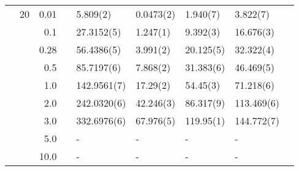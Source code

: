 \begin{table}[H]
\begin{tabularx}{\textwidth}{R{1cm}rrcR{2.3cm}R{2.3cm}R{2.3cm}R{2.3cm}R{1cm}}
		&20 & 0.01 && 5.809(2) & 0.0473(2) & 1.940(7) & 3.822(7) \\
		&& 0.1 && 27.3152(5) & 1.247(1) & 9.392(3) & 16.676(3) \\
		&& 0.28 && 56.4386(5) & 3.991(2) & 20.125(5) & 32.322(4) \\
		&& 0.5 && 85.7197(6) & 7.868(2) & 31.383(6) & 46.469(5) \\
		&& 1.0 && 142.9561(7) & 17.29(2) & 54.45(3) & 71.218(6) \\
		&& 2.0 && 242.0320(6) & 42.246(3) & 86.317(9) & 113.469(6) \\
		&& 3.0 && 332.6976(6) & 67.976(5) & 119.95(1) & 144.772(7) \\ 
		&& 5.0 && - & - & - & - \\
		&& 10.0 && - & - & - & - \\
		\hline \hline
	\end{tabularx}
\end{table}

